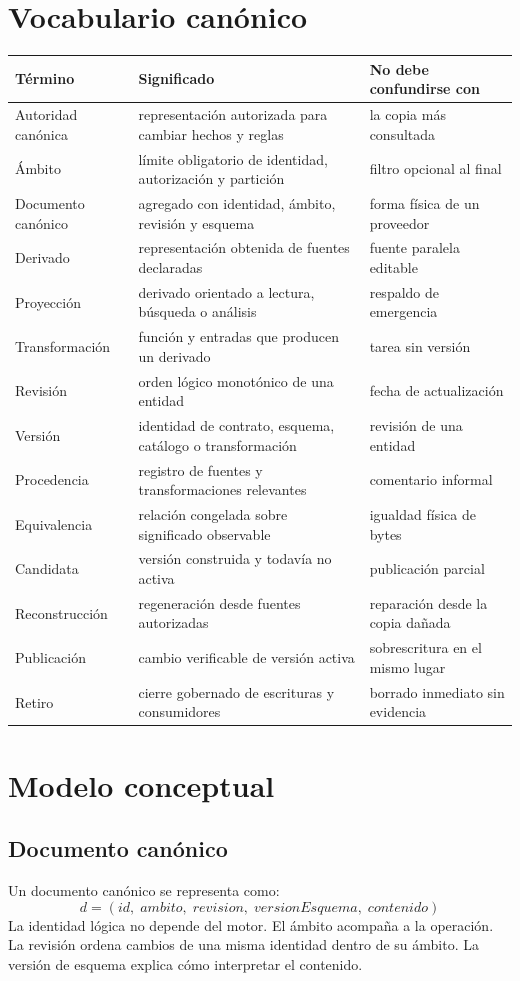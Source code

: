 \documentclass[11pt,letterpaper]{article}
\begin{document}
\section{Vocabulario canónico}
\begin{longtable}{p{.22\linewidth}p{.42\linewidth}p{.28\linewidth}}
\toprule Término & Significado & No debe confundirse con \\ \midrule
Autoridad canónica & representación autorizada para cambiar hechos y reglas & la copia más consultada \\
Ámbito & límite obligatorio de identidad, autorización y partición & filtro opcional al final \\
Documento canónico & agregado con identidad, ámbito, revisión y esquema & forma física de un proveedor \\
Derivado & representación obtenida de fuentes declaradas & fuente paralela editable \\
Proyección & derivado orientado a lectura, búsqueda o análisis & respaldo de emergencia \\
Transformación & función y entradas que producen un derivado & tarea sin versión \\
Revisión & orden lógico monotónico de una entidad & fecha de actualización \\
Versión & identidad de contrato, esquema, catálogo o transformación & revisión de una entidad \\
Procedencia & registro de fuentes y transformaciones relevantes & comentario informal \\
Equivalencia & relación congelada sobre significado observable & igualdad física de bytes \\
Candidata & versión construida y todavía no activa & publicación parcial \\
Reconstrucción & regeneración desde fuentes autorizadas & reparación desde la copia dañada \\
Publicación & cambio verificable de versión activa & sobrescritura en el mismo lugar \\
Retiro & cierre gobernado de escrituras y consumidores & borrado inmediato sin evidencia \\ \bottomrule
\end{longtable}

\section{Modelo conceptual}
\subsection{Documento canónico}
Un documento canónico se representa como:
\[d = (id,\; ambito,\; revision,\; versionEsquema,\; contenido)\]
La identidad lógica no depende del motor. El ámbito acompaña a la operación. La revisión
ordena cambios de una misma identidad dentro de su ámbito. La versión de esquema explica
cómo interpretar el contenido.
\end{document}
